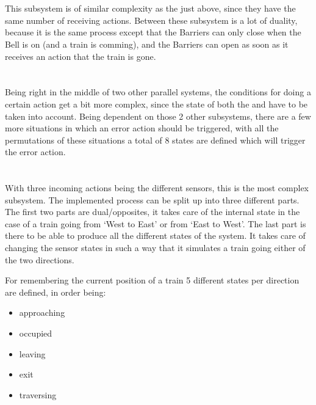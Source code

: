 \documentclass[final]{report}
\begin{document}
\section{}
This subsystem is of similar complexity as the  just above, since they have the same number of receiving actions.
Between these subsystem is a lot of duality, because it is the same process except that the Barriers can only close when the Bell is on (and a train is comming), and the Barriers can open as soon as it receives an action that the train is gone.

\section{}
Being right in the middle of two other parallel systems, the conditions for doing a certain action get a bit more complex, since the state of both the  and   have to be taken into account.
Being dependent on those 2 other subsystems, there are a few more situations in which an error action should be triggered, with all the permutations of these situations a total of 8 states are defined which will trigger the error action.

\section{}
With three incoming actions being the different sensors, this is the most complex subsystem.
The implemented process can be split up into three different parts.
The first two parts are dual/opposites, it takes care of the internal state in the case of a train going from `West to East' or from `East to West'.
The last part is there to be able to produce all the different states of the system.
It takes care of changing the sensor states in such a way that it simulates a train going either of the two directions.

For remembering the current position of a train 5 different states per direction are defined, in order being:
\begin{itemize}
    \item approaching
    \item occupied
    \item leaving
    \item exit
    \item traversing
\end{itemize}
\end{document}
